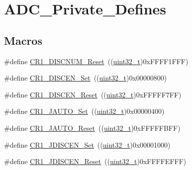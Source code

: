\hypertarget{group___a_d_c___private___defines}{}\section{A\+D\+C\+\_\+\+Private\+\_\+\+Defines}
\label{group___a_d_c___private___defines}
\subsection*{Macros}
\begin{DoxyCompactItemize}
\item 
\#define \hyperlink{group___a_d_c___private___defines_ga88cecf0c336d950115d7a52d599de816}{C\+R1\+\_\+\+D\+I\+S\+C\+N\+U\+M\+\_\+\+Reset}~((\hyperlink{_p_e___types_8h_a33594304e786b158f3fb30289278f5af}{uint32\+\_\+t})0x\+F\+F\+F\+F1\+F\+F\+F)
\item 
\#define \hyperlink{group___a_d_c___private___defines_ga95f4f653adde3407c116919c2b7d9c74}{C\+R1\+\_\+\+D\+I\+S\+C\+E\+N\+\_\+\+Set}~((\hyperlink{_p_e___types_8h_a33594304e786b158f3fb30289278f5af}{uint32\+\_\+t})0x00000800)
\item 
\#define \hyperlink{group___a_d_c___private___defines_ga959f617e77853bff85ca5e8d6fba6611}{C\+R1\+\_\+\+D\+I\+S\+C\+E\+N\+\_\+\+Reset}~((\hyperlink{_p_e___types_8h_a33594304e786b158f3fb30289278f5af}{uint32\+\_\+t})0x\+F\+F\+F\+F\+F7\+F\+F)
\item 
\#define \hyperlink{group___a_d_c___private___defines_gaa8478f12e212738e249a7fafb69d4dd4}{C\+R1\+\_\+\+J\+A\+U\+T\+O\+\_\+\+Set}~((\hyperlink{_p_e___types_8h_a33594304e786b158f3fb30289278f5af}{uint32\+\_\+t})0x00000400)
\item 
\#define \hyperlink{group___a_d_c___private___defines_gab6c4a9f0a661bf7c5add35ea3a90b756}{C\+R1\+\_\+\+J\+A\+U\+T\+O\+\_\+\+Reset}~((\hyperlink{_p_e___types_8h_a33594304e786b158f3fb30289278f5af}{uint32\+\_\+t})0x\+F\+F\+F\+F\+F\+B\+F\+F)
\item 
\#define \hyperlink{group___a_d_c___private___defines_gafef4d16c890bf5e6eb381ad01c829309}{C\+R1\+\_\+\+J\+D\+I\+S\+C\+E\+N\+\_\+\+Set}~((\hyperlink{_p_e___types_8h_a33594304e786b158f3fb30289278f5af}{uint32\+\_\+t})0x00001000)
\item 
\#define \hyperlink{group___a_d_c___private___defines_gab6ffba92495342bd5f0a8b1fa216526b}{C\+R1\+\_\+\+J\+D\+I\+S\+C\+E\+N\+\_\+\+Reset}~((\hyperlink{_p_e___types_8h_a33594304e786b158f3fb30289278f5af}{uint32\+\_\+t})0x\+F\+F\+F\+F\+E\+F\+F\+F)
\item 

\end{DoxyCompactItemize}
